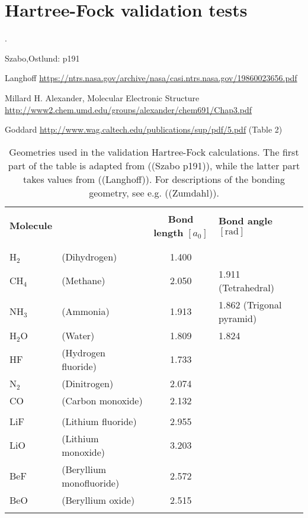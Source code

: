 \documentclass[../../master.tex]{subfiles}
\begin{document}
\renewcommand{\R}{{\bf R}}
\renewcommand{\r}{{\bf r}}
\newcommand{\p}{{\bf p}}
\newcommand{\q}{{\bf q}}
\renewcommand{\H}{\mathcal{H}}
\newcommand{\psit}{\left|\psi(t)\right\rangle}


\chapter{Hartree-Fock validation tests}
.

Szabo,Ostlund: p191

Langhoff \url{https://ntrs.nasa.gov/archive/nasa/casi.ntrs.nasa.gov/19860023656.pdf}

Millard H. Alexander, Molecular Electronic Structure \url{http://www2.chem.umd.edu/groups/alexander/chem691/Chap3.pdf}

Goddard \url{http://www.wag.caltech.edu/publications/sup/pdf/5.pdf} (Table 2)

\begin{table}
\setlength\extrarowheight{2pt}
\begin{tabularx}{\textwidth}{l X c l}
\hline
\hline
\\[-0.9em]
\textbf{Molecule} & & \textbf{Bond length} $[a_0]$ & \textbf{Bond angle} $[\text{rad}]$ \\
\\[-0.9em]
\hline
\\[-0.9em]
H${}_2$ & (Dihydrogen)   & 1.400 & \\
CH${}_4$ &(Methane)      & 2.050 & 1.911 (Tetrahedral)       \\
NH${}_3$ &(Ammonia)      & 1.913 & 1.862 (Trigonal pyramid)  \\
H${}_2$O &(Water)        & 1.809 & 1.824                     \\
HF &(Hydrogen fluoride)  & 1.733 & \\
N${}_2$ &(Dinitrogen)    & 2.074 & \\
CO &(Carbon monoxide)    & 2.132 & \\
\\[-0.0em]
LiF & (Lithium fluoride) & 2.955 & \\ %
LiO & (Lithium monoxide) & 3.203 & \\ %
BeF & (Beryllium monofluoride) & 2.572 & \\ %
BeO & (Beryllium oxide) & 2.515 & \\ %
\\[-0.9em]
\hline
\end{tabularx}
\caption{Geometries used in the validation Hartree-Fock calculations. The first part of the table is adapted from ((Szabo p191)), while the latter part takes values from ((Langhoff)). For descriptions of the bonding geometry, see e.g. ((Zumdahl)). \label{tab:hfv1}}
\end{table}
\end{document}
